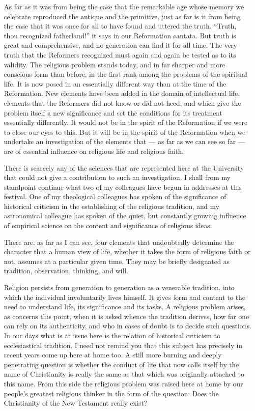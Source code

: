 \documentclass[12pt,a4paper,openany]{book}
\newcommand{\opage}[1]{\marginnote{\footnotesize\textit{[#1]}}}
\begin{document}
As far as it was from being the case that the remarkable age
whose memory we celebrate reproduced the antique and the
primitive, just as far is it from being the case that it was once for all to
have found and uttered the truth. ``Truth, thou recognized
fatherland!'' it says in our Reformation cantata. But
truth is great and comprehensive, and no generation can find
it for all time. The very truth that the Reformers
recognized must again and again be tested as to its validity. The
religious problem stands today, and in far sharper
and more conscious form than before, in the first rank among the
problems of the spiritual life. It is now posed in an essentially
different way than at the time of the Reformation. New elements
have been added in the domain of intellectual life, elements
that the Reformers did not know or did not heed, and which give
the problem itself a new significance and set the conditions for its
treatment essentially differently. It would not be in the spirit of
the Reformation if we were to close our eyes to this. But
it will be in the spirit of the Reformation when we undertake
an investigation of the elements that --- as far as we can
see so far --- are of essential influence on religious life and
religious faith.

There is scarcely any of the sciences that are
represented here at the University that could not
give a contribution to such an investigation. I shall from my
standpoint continue what two of my colleagues have begun
\opage{218}in addresses at this festival. One of my theological colleagues
has spoken of the significance of historical criticism in
the establishing of the religious tradition, and my astronomical
colleague has spoken of the quiet, but constantly
growing influence of empirical science on the content and
significance of religious ideas.

There are, as far as I can see, four elements that undoubtedly
determine the character that a human view of life, whether
it takes the form of religious faith or not, assumes
at a particular given time. They may be briefly designated as
tradition, observation, thinking, and will.

Religion persists from generation to generation as a venerable
tradition, into which the individual involuntarily lives himself.
It gives form and content to the need to understand
life, its significance and its tasks. A religious
problem arises, as concerns this point, when it is asked
whence the tradition derives, how far one can rely
on its authenticity, and who in cases of doubt is to decide
such questions. In our days what is at issue here is the
relation of historical criticism to ecclesiastical tradition. I
need not remind you that this subject has precisely in recent
years come up here at home too. A still more
burning and deeply penetrating question is whether the
conduct of life that now calls itself by the name of Christianity
is really the same as that which was originally attached to
this name. From this side the religious problem was raised
here at home by our people's greatest religious thinker in the form of
the question: Does the Christianity of the New Testament
really exist?
\end{document}
